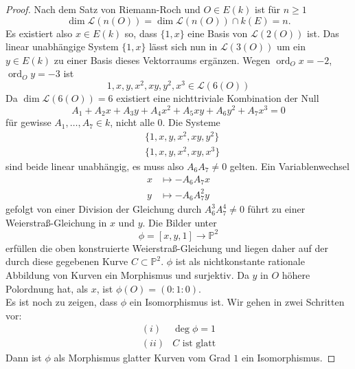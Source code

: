 \documentclass{amsart}
\makeatletter
\theoremstyle{plain}
\theoremstyle{definition}
\newcommand{\projspace}{\mathds{P}}
\newcommand{\riemannspace}{\mathcal{L}}
\newcommand{\ord}{\operatorname{ord}}
\newcommand{\mathleft}{\@fleqntrue\@mathmargin20pt}
\newcommand{\mathcenter}{\@fleqnfalse}
\makeatother
\begin{document}
\begin{proof}
	Nach dem Satz von Riemann-Roch und $O \in E(k)$ ist für $n \geq 1$
	\begin{equation*}
		\dim \riemannspace(n(O)) = \dim \riemannspace(n(O)) \cap k(E) = n.
	\end{equation*}
	Es existiert also $x \in E(k)$ so, dass $\{1, x\}$ eine Basis von $\riemannspace(2(O))$ ist.
	Das linear unabhängige System $\{1, x\}$ lässt sich nun in $\riemannspace(3(O))$ um ein $y \in E(k)$ zu einer Basis dieses Vektorraums ergänzen.
	Wegen $\ord_O x = -2$, $\ord_O y = -3$ ist
	\begin{equation*}
		1, x, y, x^2, xy, y^2, x^3 \in \riemannspace(6(O))
	\end{equation*}
	Da $\dim \riemannspace(6(O)) = 6$ existiert eine nichttriviale Kombination der Null
	\begin{equation*}
		A_1 + A_2 x + A_3 y + A_4 x^2 + A_5 x y + A_6 y^2 + A_7 x^3 = 0
	\end{equation*}
	für gewisse $A_1, \dots, A_7 \in k$, nicht alle $0$.
	Die Systeme
	\begin{align*}
		& \{1, x, y, x^2, xy, y^2\} \\
		& \{1, x, y, x^2, xy, x^3\}
	\end{align*}
	sind beide linear unabhängig, es muss also $A_6 A_7 \neq 0$ gelten.
	Ein Variablenwechsel
	\begin{align*}
		x & \mapsto -A_6A_7 x \\
		y & \mapsto -A_6A_7^2 y
	\end{align*}
	gefolgt von einer Division der Gleichung durch $A_6^3A_7^4 \neq 0$ führt zu einer Weierstraß-Gleichung in $x$ und $y$.
	Die Bilder unter
	\begin{equation*}
		\phi = [x, y, 1] \rightarrow \projspace^2
	\end{equation*}
	erfüllen die oben konstruierte Weierstraß-Gleichung und liegen daher auf der durch diese gegebenen Kurve $C \subset \projspace^2$.
	$\phi$ ist als nichtkonstante rationale Abbildung von Kurven ein Morphismus und surjektiv.
	Da $y$ in $O$ höhere Polordnung hat, als $x$, ist $\phi(O) = (0 : 1 : 0)$. \\
	Es ist noch zu zeigen, dass $\phi$ ein Isomorphismus ist. Wir gehen in zwei Schritten vor: 
	\mathleft
		\begin{equation*}
			\begin{array}{ll}
				(i) & \deg \phi = 1 \\
				(ii) & C \text{ ist glatt}
			\end{array}
		\end{equation*}
	\mathcenter
	Dann ist $\phi$ als Morphismus glatter Kurven vom Grad $1$ ein Isomorphismus.


\end{proof}
\end{document}
